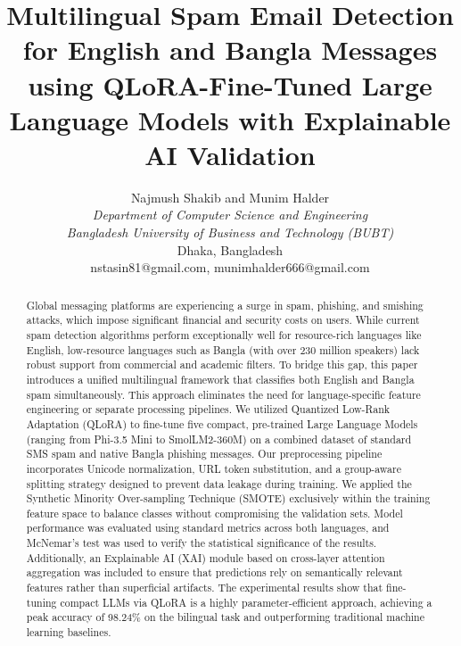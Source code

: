 \documentclass[journal]{IEEEtran}
\begin{document}
\title{Multilingual Spam Email Detection for English and Bangla Messages using QLoRA-Fine-Tuned Large Language Models with Explainable AI Validation}

\author{Najmush Shakib and Munim Halder \\
\textit{Department of Computer Science and Engineering} \\
\textit{Bangladesh University of Business and Technology (BUBT)} \\
Dhaka, Bangladesh \\
nstasin81@gmail.com, munimhalder666@gmail.com
}

\maketitle

\begin{abstract}
Global messaging platforms are experiencing a surge in spam, phishing, and smishing attacks, which impose significant financial and security costs on users. While current spam detection algorithms perform exceptionally well for resource-rich languages like English, low-resource languages such as Bangla (with over 230 million speakers) lack robust support from commercial and academic filters. To bridge this gap, this paper introduces a unified multilingual framework that classifies both English and Bangla spam simultaneously. This approach eliminates the need for language-specific feature engineering or separate processing pipelines. We utilized Quantized Low-Rank Adaptation (QLoRA) to fine-tune five compact, pre-trained Large Language Models (ranging from Phi-3.5 Mini to SmolLM2-360M) on a combined dataset of standard SMS spam and native Bangla phishing messages. Our preprocessing pipeline incorporates Unicode normalization, URL token substitution, and a group-aware splitting strategy designed to prevent data leakage during training. We applied the Synthetic Minority Over-sampling Technique (SMOTE) exclusively within the training feature space to balance classes without compromising the validation sets. Model performance was evaluated using standard metrics across both languages, and McNemar's test was used to verify the statistical significance of the results. Additionally, an Explainable AI (XAI) module based on cross-layer attention aggregation was included to ensure that predictions rely on semantically relevant features rather than superficial artifacts. The experimental results show that fine-tuning compact LLMs via QLoRA is a highly parameter-efficient approach, achieving a peak accuracy of 98.24\% on the bilingual task and outperforming traditional machine learning baselines.
\end{abstract}
\end{document}
